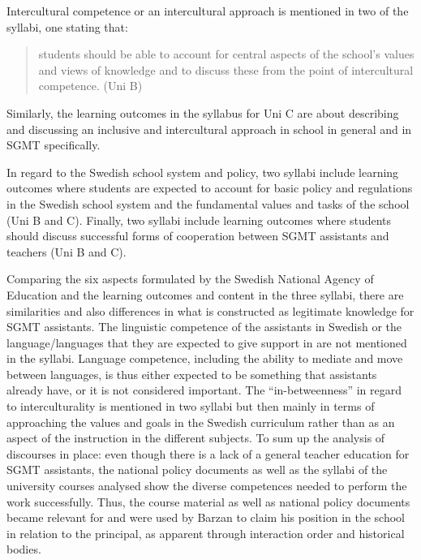 \documentclass[output=paper]{langscibook}
\begin{document}
Intercultural competence or an intercultural approach is mentioned in two of the syllabi, one stating that:

\begin{quote}
students should be able to account for central aspects of the school’s values and views of knowledge and to discuss these from the point of intercultural competence. (Uni B)
\end{quote}

Similarly, the learning outcomes in the syllabus for Uni C are about describing and discussing an inclusive and intercultural approach in school in general and in SGMT specifically. 

In regard to the Swedish school system and policy, two syllabi include learning outcomes where students are expected to account for basic policy and regulations in the Swedish school system and the fundamental values and tasks of the school (Uni B and C). Finally, two syllabi include learning outcomes where students should discuss successful forms of cooperation between SGMT assistants and teachers (Uni B and C).

Comparing the six aspects formulated by the Swedish National Agency of Education and the learning outcomes and content in the three syllabi, there are similarities and also differences in what is constructed as legitimate knowledge for SGMT assistants. The linguistic competence of the assistants in Swedish or the language/languages that they are expected to give support in are not mentioned in the syllabi. Language competence, including the ability to mediate and move between languages, is thus either expected to be something that assistants already have, or it is not considered important. The “in-betweenness” in regard to interculturality is mentioned in two syllabi but then mainly in terms of approaching the values and goals in the Swedish curriculum rather than as an aspect of the instruction in the different subjects. To sum up the analysis of discourses in place: even though there is a lack of a general teacher education for SGMT assistants, the national policy documents as well as the syllabi of the university courses analysed show the diverse competences needed to perform the work successfully. Thus, the course material as well as national policy documents became relevant for and were used by Barzan to claim his position in the school in relation to the principal, as apparent through interaction order and historical bodies.
\end{document}
